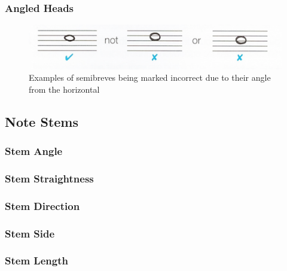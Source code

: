 \subsubsection{Angled Heads}\label{sec:tf-semibreve-angled}

\begin{figure}[hbt]
  \centering
  \includegraphics{gfx/basic/semibreve-on-space.png}
  \caption{Examples of semibreves being marked incorrect due to their angle from the horizontal}
  \label{fig:music-theory-semibreve-angled}
\end{figure}

\subsection{Note Stems}

\subsubsection{Stem Angle}\label{sec:tf-stem-angle}

\subsubsection{Stem Straightness}\label{sec:tf-stem-straightness}

\subsubsection{Stem Direction}\label{sec:tf-stem-direction}

\subsubsection{Stem Side}\label{sec:tf-stem-side}

\subsubsection{Stem Length}\label{sec:tf-stem-length}

